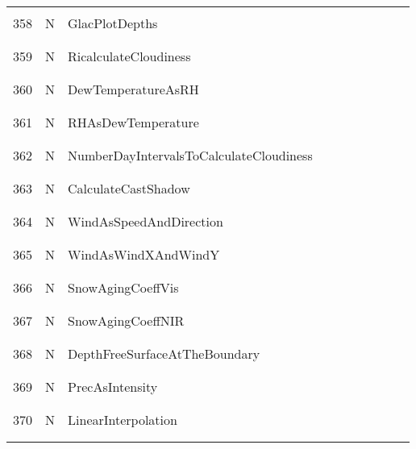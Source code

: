\begin{longtable}{|c|c|l|c|c|c|c|p{}|c|p{}|}
&&&&&&&&&\\
358 & N & GlacPlotDepths & & & & & & & \\
&&&&&&&&&\\\hline%
&&&&&&&&&\\
359 & N & RicalculateCloudiness & & & & & & & \\
&&&&&&&&&\\\hline%
&&&&&&&&&\\
360 & N & DewTemperatureAsRH & & & & & & & \\
&&&&&&&&&\\\hline%
&&&&&&&&&\\
361 & N & RHAsDewTemperature & & & & & & & \\
&&&&&&&&&\\\hline%
&&&&&&&&&\\
362 & N & NumberDayIntervalsToCalculateCloudiness & & & & & & & \\
&&&&&&&&&\\\hline%
&&&&&&&&&\\
363 & N & CalculateCastShadow & & & & & & & \\
&&&&&&&&&\\\hline%
&&&&&&&&&\\
364 & N & WindAsSpeedAndDirection & & & & & & & \\
&&&&&&&&&\\\hline%
&&&&&&&&&\\
365 & N & WindAsWindXAndWindY & & & & & & & \\
&&&&&&&&&\\\hline%
&&&&&&&&&\\
366 & N & SnowAgingCoeffVis & & & & & & & \\
&&&&&&&&&\\\hline%
&&&&&&&&&\\
367 & N & SnowAgingCoeffNIR & & & & & & & \\
&&&&&&&&&\\\hline%
&&&&&&&&&\\
368 & N & DepthFreeSurfaceAtTheBoundary & & & & & & & \\
&&&&&&&&&\\\hline%
&&&&&&&&&\\
369 & N & PrecAsIntensity & & & & & & & \\
&&&&&&&&&\\\hline%
&&&&&&&&&\\
370 & N & LinearInterpolation & & & & & & & \\
&&&&&&&&&\\\hline%
&&&&&&&&&\\

\end{longtable}
